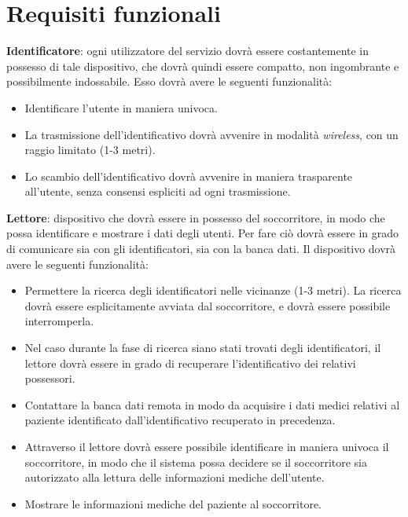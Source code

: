 \documentclass[a4paper,12pt]{report}
\begin{document}
\section{Requisiti funzionali}
\begin{description}
	\item \textbf{Identificatore}: ogni utilizzatore del servizio dovrà essere costantemente in possesso di tale dispositivo, che dovrà quindi essere compatto, non ingombrante e possibilmente indossabile. Esso dovrà avere le seguenti funzionalità: 
	\begin{itemize}
		\item Identificare l'utente in maniera univoca.
		\item La trasmissione dell'identificativo dovrà avvenire in modalità \emph{wireless}, con un raggio limitato (1-3 metri).
		\item Lo scambio dell'identificativo dovrà avvenire in maniera trasparente all'utente, senza consensi espliciti ad ogni trasmissione.
	\end{itemize}

	\item \textbf{Lettore}: dispositivo che dovrà essere in possesso del soccorritore, in modo che possa identificare e mostrare i dati degli utenti. Per fare ciò dovrà essere in grado di comunicare sia con gli identificatori, sia con la banca dati. Il dispositivo dovrà avere le seguenti funzionalità:
	\begin{itemize}
		\item Permettere la ricerca degli identificatori nelle vicinanze (1-3 metri). La ricerca dovrà essere esplicitamente avviata dal soccorritore, e dovrà essere possibile interromperla.
		\item Nel caso durante la fase di ricerca siano stati trovati degli identificatori, il lettore dovrà essere in grado di recuperare l'identificativo dei relativi possessori.
		\item Contattare la banca dati remota in modo da acquisire i dati medici relativi al paziente identificato dall'identificativo recuperato in precedenza.
		\item Attraverso il lettore dovrà essere possibile identificare in maniera univoca il soccorritore, in modo che il sistema possa decidere se il soccorritore sia autorizzato alla lettura delle informazioni mediche dell'utente.
		\item Mostrare le informazioni mediche del paziente al soccorritore.
	\end{itemize}
\end{description}
\end{document}

